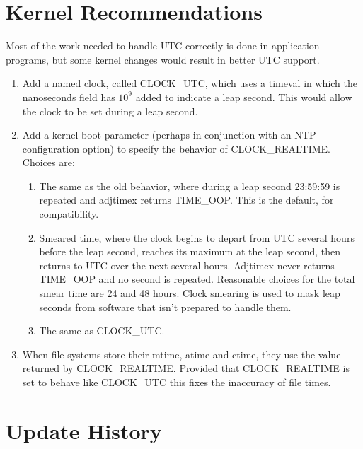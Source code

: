 \documentclass[letterpaper,twoside]{article}
\begin{document}
\section{Kernel Recommendations}
\label{section:KernelRecommendations}
Most of the work needed to handle UTC correctly is done in application
programs, but some kernel changes would result in better UTC support.
\begin{enumerate}
\item Add a named clock, called {\ttfamily CLOCK\_UTC}, which uses
  a {\ttfamily timeval} in which the nanoseconds field has $10^{9}$ added to
  indicate a leap second.  This would allow the clock to be set
  during a leap second.
\item Add a kernel boot parameter (perhaps in conjunction with
  an NTP configuration option) to specify the behavior of
  {\ttfamily CLOCK\_REALTIME}.
  Choices are:
  \begin{enumerate}
  \item The same as the old behavior, where during a leap second
    23:59:59 is repeated and {\ttfamily adjtimex} returns
    {\ttfamily TIME\_OOP}.  This is the default, for compatibility.
  \item Smeared time, where the clock begins to depart from UTC several hours
    before the leap second, reaches its maximum at the leap second, then
    returns to UTC over the next several hours.  {\ttfamily Adjtimex}
    never returns {\ttfamily TIME\_OOP} and no second is repeated.
    Reasonable choices for the total smear time are 24 and 48 hours.
    Clock smearing is used to mask leap seconds from software that isn't
    prepared to handle them.
  \item The same as {\ttfamily CLOCK\_UTC}.
  \end{enumerate}
\item When file systems store their mtime, atime and ctime, they use
  the value returned by {\ttfamily CLOCK\_REALTIME}.  Provided that
  {\ttfamily CLOCK\_REALTIME} is set to behave like {\ttfamily CLOCK\_UTC}
  this fixes the inaccuracy of file times.
\end{enumerate}

\section{Update History}
\end{document}
